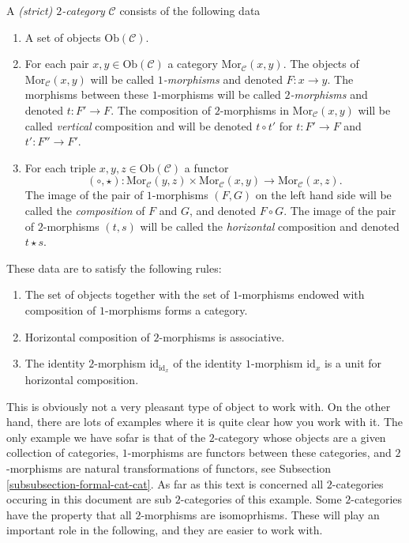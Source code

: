 \begin{definition}
\label{definition-2-category}
A {\it (strict) $2$-category} $\mathcal{C}$ consists of the following data
\begin{enumerate}
\item A set of objects $\text{Ob}(\mathcal{C})$.
\item For each pair $x,y \in \text{Ob}(\mathcal{C})$
a category $\text{Mor}_\mathcal{C}(x,y)$. The objects of
$\text{Mor}_\mathcal{C}(x,y)$ will be called {\it $1$-morphisms}
and denoted $F : x \to y$. The morphisms between these $1$-morphisms
will be called {\it $2$-morphisms} and denoted $t : F' \to F$.
The composition of $2$-morphisms in $\text{Mor}_\mathcal{C}(x,y)$
will be called {\it vertical} composition and will be
denoted $t \circ t'$ for $t : F' \to F$ and $t' : F'' \to F'$.
\item For each triple $x,y,z\in \text{Ob}(\mathcal{C})$ a
functor
$$
(\circ, \star) : 
\text{Mor}_\mathcal{C}(y,z) \times \text{Mor}_\mathcal{C}(x,y) 
\longrightarrow
\text{Mor}_\mathcal{C}(x,z).
$$
The image of the pair of $1$-morphisms $(F,G)$ on the left hand side
will be called the {\it composition} of $F$ and $G$, and denoted
$F\circ G$. The image of the pair of $2$-morphisms $(t,s)$ will
be called the {\it horizontal} composition and denoted $t \star s$.
\end{enumerate}
These data are to satisfy the following rules:
\begin{enumerate}
\item The set of objects together with the set of $1$-morphisms endowed
with composition of $1$-morphisms forms a category.
\item Horizontal composition of $2$-morphisms is associative.
\item The identity $2$-morphism $\text{id}_{\text{id}_x}$
of the identity $1$-morphism $\text{id}_x$ is a unit for
horizontal composition.
\end{enumerate}
\end{definition}

\noindent
This is obviously not a very pleasant type of object to work with.
On the other hand, there are lots of examples where it is quite clear
how you work with it. The only example we have sofar is that of
the $2$-category whose objects are a given collection of categories,
$1$-morphisms are functors between these categories,
and $2$-morphisms are natural transformations of functors, see
Subsection \ref{subsubsection-formal-cat-cat}.
As far as this text is concerned
all $2$-categories occuring in this document are sub $2$-categories
of this example. Some $2$-categories have the property that all $2$-morphisms
are isomoprhisms. These will play an important role in the following,
and they are easier to work with.

